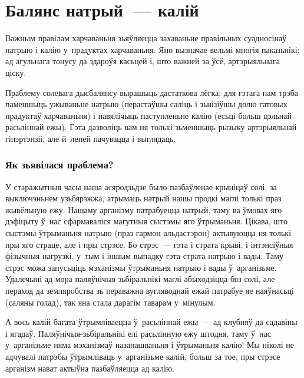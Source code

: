\chapter{Балянс натрый~--- калій}

Важным правілам харчаваньня зьяўляецца захаваньне правільных суадносінаў натрыю  і калію  у~прадуктах харчаваньня. Яно вызначае вельмі многія паказьнікі: ад агульнага тонусу да здароўя касьцей і, што важней за ўсё, артэрыяльнага ціску.

Праблему солевага дысбалянсу вырашыць дастаткова лёгка: для гэтага нам трэба паменшыць ужываньне натрыю (перастаўшы саліць і зьнізіўшы долю гатовых прадуктаў харчаваньня) і павялічыць паступленьне калію (есьці больш цэльнай расьліннай ежы). Гэта дазволіць вам ня толькі зьменшыць рызыку артэрыяльнай гіпэртэнзіі, але й~лепей пачувацца і выглядаць.

\subsection{Як зьявілася праблема?}

У старажытныя часы наша асяродзьдзе было пазбаўленае крыніцаў солі, за выключэньнем узьбярэжжа, атрымаць натрый нашы продкі маглі толькі праз жывёльную ежу. Нашаму арганізму патрабуецца натрый, таму ва ўмовах яго дэфіцыту ў~нас сфармаваліся магутныя сыстэмы яго ўтрыманьня. Цікава, што сыстэмы ўтрыманьня натрыю (праз гармон альдастэрон) актывуюцца ня толькі пры яго страце, але і пры стрэсе. Бо стрэс~--- гэта і страта крыві, і інтэнсіўныя фізычныя нагрузкі, у~тым і іншым выпадку  гэта страта натрыю і вады. Таму стрэс можа запусьціць мэханізмы ўтрыманьня натрыю і вады ў~арганізьме. Удалечыні ад мора паляўнічыя-зьбіральнікі маглі абыходзіцца бяз солі, але пераход да земляробства зь пераважна вугляводнай ежай патрабуе яе наяўнасьці (саляны голад), так яна стала дарагім таварам у~мінулым.

А вось калій багата ўтрымліваецца ў~расьліннай ежы~--- ад клубняў да садавіны і ягадаў. Паляўнічыя-зьбіральнікі елі расьлінную ежу штодня, таму ў~нас у~арганізьме няма мэханізмаў назапашваньня і ўтрыманьня калію! Мы ніколі не адчувалі патрэбы ўтрымліваць у~арганізьме калій, больш за тое, пры стрэсе арганізм нават актыўна пазбаўляецца ад калію.


